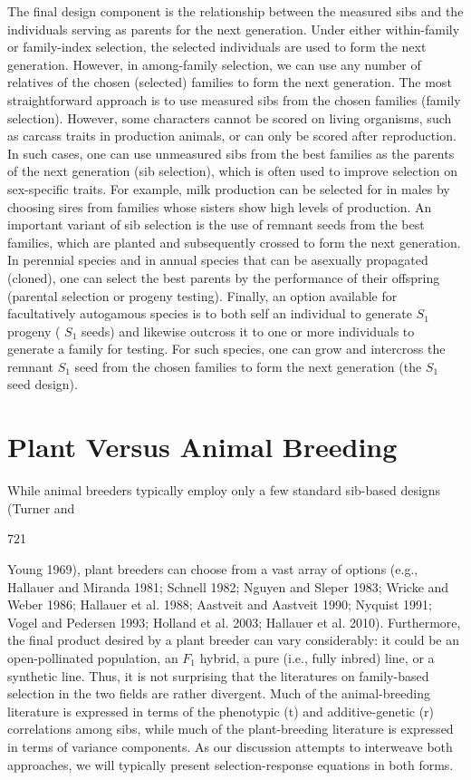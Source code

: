 \documentclass{article}
\begin{document}
The final design component is the relationship between the measured sibs and the individuals serving as parents for the next generation. Under either within-family or family-index selection, the selected individuals are used to form the next generation. However, in among-family selection, we can use any number of relatives of the chosen (selected) families to form the next generation. The most straightforward approach is to use measured sibs from the chosen families (family selection). However, some characters cannot be scored on living organisms, such as carcass traits in production animals, or can only be scored after reproduction. In such cases, one can use unmeasured sibs from the best families as the parents of the next generation (sib selection), which is often used to improve selection on sex-specific traits. For example, milk production can be selected for in males by choosing sires from families whose sisters show high levels of production. An important variant of sib selection is the use of remnant seeds from the best families, which are planted and subsequently crossed to form the next generation. In perennial species and in annual species that can be asexually propagated (cloned), one can select the best parents by the performance of their offspring (parental selection or progeny testing). Finally, an option available for facultatively autogamous species is to both self an individual to generate  $ S_{1} $ progeny ( $ S_{1} $ seeds) and likewise outcross it to one or more individuals to generate a family for testing. For such species, one can grow and intercross the remnant  $ S_{1} $ seed from the chosen families to form the next generation (the  $ S_{1} $ seed design).

\section{Plant Versus Animal Breeding}
While animal breeders typically employ only a few standard sib-based designs (Turner and

721

Young 1969), plant breeders can choose from a vast array of options (e.g., Hallauer and Miranda 1981; Schnell 1982; Nguyen and Sleper 1983; Wricke and Weber 1986; Hallauer et al. 1988; Aastveit and Aastveit 1990; Nyquist 1991; Vogel and Pedersen 1993; Holland et al. 2003; Hallauer et al. 2010). Furthermore, the final product desired by a plant breeder can vary considerably: it could be an open-pollinated population, an  $ F_{1} $ hybrid, a pure (i.e., fully inbred) line, or a synthetic line. Thus, it is not surprising that the literatures on family-based selection in the two fields are rather divergent. Much of the animal-breeding literature is expressed in terms of the phenotypic (t) and additive-genetic (r) correlations among sibs, while much of the plant-breeding literature is expressed in terms of variance components. As our discussion attempts to interweave both approaches, we will typically present selection-response equations in both forms.
\end{document}
